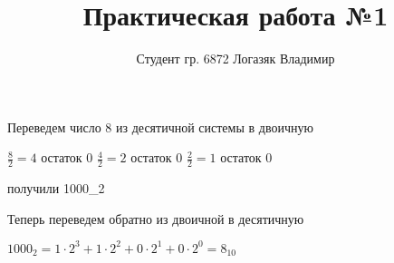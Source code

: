 \documentclass[a4paper,11pt]{article}
\title{Практическая работа №1}
\author{Студент гр. 6872 Логазяк Владимир}
\begin{document}
 
\maketitle

Переведем число 8 из десятичной системы в двоичную

$\frac{8}{2}=4$ остаток 0 $\frac{4}{2}=2$ остаток 0 $\frac{2}{2}=1$ остаток 0

получили 1000_2

Теперь переведем обратно из двоичной в десятичную

$1000_2=1\cdot2^3+1\cdot2^2+0\cdot2^1+0\cdot2^0=8_{10}$
\end{document}
